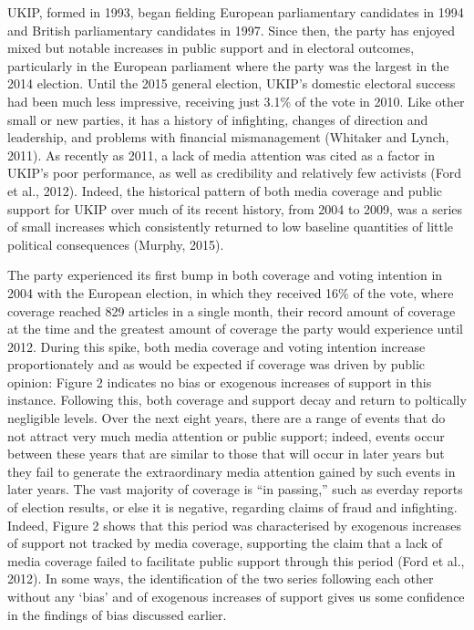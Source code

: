 \documentclass[12pt,article]{article}
\begin{document}
UKIP, formed in 1993, began fielding European parliamentary candidates
in 1994 and British parliamentary candidates in 1997. Since then, the
party has enjoyed mixed but notable increases in public support and in
electoral outcomes, particularly in the European parliament where the
party was the largest in the 2014 election. Until the 2015 general
election, UKIP's domestic electoral success had been much less
impressive, receiving just 3.1\% of the vote in 2010. Like other small
or new parties, it has a history of infighting, changes of direction and
leadership, and problems with financial mismanagement (Whitaker and
Lynch, 2011). As recently as 2011, a lack of media attention was cited
as a factor in UKIP's poor performance, as well as credibility and
relatively few activists (Ford et al., 2012). Indeed, the historical
pattern of both media coverage and public support for UKIP over much of
its recent history, from 2004 to 2009, was a series of small increases
which consistently returned to low baseline quantities of little
political consequences (Murphy, 2015).

The party experienced its first bump in both coverage and voting
intention in 2004 with the European election, in which they received
16\% of the vote, where coverage reached 829 articles in a single month,
their record amount of coverage at the time and the greatest amount of
coverage the party would experience until 2012. During this spike, both
media coverage and voting intention increase proportionately and as
would be expected if coverage was driven by public opinion: Figure 2
indicates no bias or exogenous increases of support in this instance.
Following this, both coverage and support decay and return to poltically
negligible levels. Over the next eight years, there are a range of
events that do not attract very much media attention or public support;
indeed, events occur between these years that are similar to those that
will occur in later years but they fail to generate the extraordinary
media attention gained by such events in later years. The vast majority
of coverage is ``in passing,'' such as everday reports of election
results, or else it is negative, regarding claims of fraud and
infighting. Indeed, Figure 2 shows that this period was characterised by
exogenous increases of support not tracked by media coverage, supporting
the claim that a lack of media coverage failed to facilitate public
support through this period (Ford et al., 2012). In some ways, the
identification of the two series following each other without any `bias'
and of exogenous increases of support gives us some confidence in the
findings of bias discussed earlier.
\end{document}
